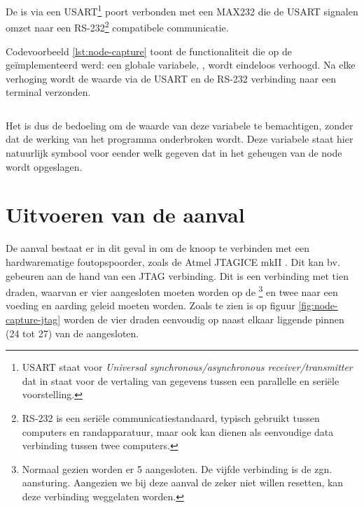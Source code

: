 De \mcu is via een USART\footnote{USART staat voor \emph{Universal
synchronous/asynchronous receiver/transmitter} dat in staat voor de vertaling
van gegevens tussen een parallelle en seri\"ele voorstelling.} poort verbonden
met een MAX232 \citep{datasheet:max232} die de USART signalen omzet naar een
RS-232\footnote{RS-232 is een seri\"ele communicatiestandaard, typisch gebruikt
tussen computers en randapparatuur, maar ook kan dienen als eenvoudige data
verbinding tussen twee computers.} compatibele communicatie.

Codevoorbeeld \ref{lst:node-capture} toont de functionaliteit die op de \mcu
ge\"implementeerd werd: een globale variabele, , wordt eindeloos
verhoogd. Na elke verhoging wordt de waarde via de USART en de RS-232
verbinding naar een terminal verzonden. 

\inputminted[linenos,frame=lines,framesep=2mm,fontsize=\footnotesize]{c}{../src/node-capture/main.c}
\vspace{-5mm}
\vspace{3mm}

Het is dus de bedoeling om de waarde van deze  variabele te
bemachtigen, zonder dat de werking van het programma onderbroken wordt. Deze
variabele staat hier natuurlijk symbool voor eender welk gegeven dat in het
geheugen van de node wordt opgeslagen.

\section{Uitvoeren van de aanval}

De aanval bestaat er in dit geval in om de knoop te verbinden met een
hardwarematige foutopspoorder, zoals de Atmel JTAGICE mkII
\citep{manual:jtagicemkii}. Dit kan bv. gebeuren aan de hand van een JTAG
verbinding. Dit is een verbinding met tien draden, waarvan er vier aangesloten
moeten worden op de \mcu\footnote{Normaal gezien worden er 5 aangesloten. De
vijfde verbinding is de zgn.  aansturing. Aangezien we bij deze
aanval de \mcu zeker niet willen resetten, kan deze verbinding weggelaten
worden.} en twee naar een voeding en aarding geleid moeten worden. Zoals te
zien is op figuur \ref{fig:node-capture-jtag} worden de vier draden eenvoudig
op naast elkaar liggende pinnen (24 tot 27) van de \mcu aangesloten.

